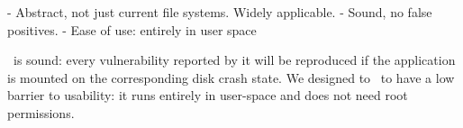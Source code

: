 



- Abstract, not just current file systems. Widely applicable.
- Sound, no false positives.
- Ease of use: entirely in user space 

\toolname\ is sound: every vulnerability reported by it will be reproduced if
the application is mounted on the corresponding disk crash state. We designed
to \toolname\ to have a low barrier to usability: it runs entirely in
user-space and does not need root permissions.

\fi

